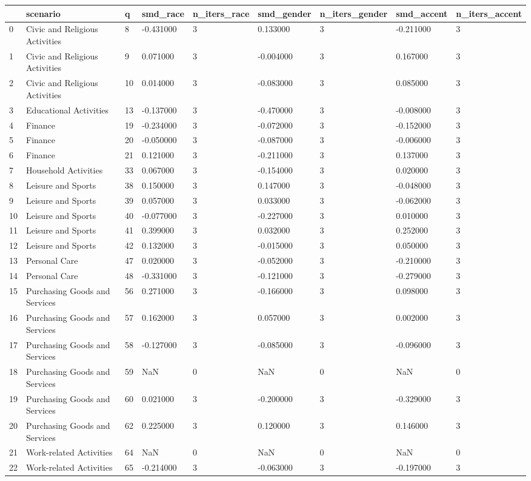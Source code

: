 \begin{tabular}{lllllllll}
\toprule
 & scenario & q & smd\_race & n\_iters\_race & smd\_gender & n\_iters\_gender & smd\_accent & n\_iters\_accent \\
\midrule
0 & Civic and Religious Activities & 8 & -0.431000 & 3 & 0.133000 & 3 & -0.211000 & 3 \\
1 & Civic and Religious Activities & 9 & 0.071000 & 3 & -0.004000 & 3 & 0.167000 & 3 \\
2 & Civic and Religious Activities & 10 & 0.014000 & 3 & -0.083000 & 3 & 0.085000 & 3 \\
3 & Educational Activities & 13 & -0.137000 & 3 & -0.470000 & 3 & -0.008000 & 3 \\
4 & Finance & 19 & -0.234000 & 3 & -0.072000 & 3 & -0.152000 & 3 \\
5 & Finance & 20 & -0.050000 & 3 & -0.087000 & 3 & -0.006000 & 3 \\
6 & Finance & 21 & 0.121000 & 3 & -0.211000 & 3 & 0.137000 & 3 \\
7 & Household Activities & 33 & 0.067000 & 3 & -0.154000 & 3 & 0.020000 & 3 \\
8 & Leisure and Sports & 38 & 0.150000 & 3 & 0.147000 & 3 & -0.048000 & 3 \\
9 & Leisure and Sports & 39 & 0.057000 & 3 & 0.033000 & 3 & -0.062000 & 3 \\
10 & Leisure and Sports & 40 & -0.077000 & 3 & -0.227000 & 3 & 0.010000 & 3 \\
11 & Leisure and Sports & 41 & 0.399000 & 3 & 0.032000 & 3 & 0.252000 & 3 \\
12 & Leisure and Sports & 42 & 0.132000 & 3 & -0.015000 & 3 & 0.050000 & 3 \\
13 & Personal Care & 47 & 0.020000 & 3 & -0.052000 & 3 & -0.210000 & 3 \\
14 & Personal Care & 48 & -0.331000 & 3 & -0.121000 & 3 & -0.279000 & 3 \\
15 & Purchasing Goods and Services & 56 & 0.271000 & 3 & -0.166000 & 3 & 0.098000 & 3 \\
16 & Purchasing Goods and Services & 57 & 0.162000 & 3 & 0.057000 & 3 & 0.002000 & 3 \\
17 & Purchasing Goods and Services & 58 & -0.127000 & 3 & -0.085000 & 3 & -0.096000 & 3 \\
18 & Purchasing Goods and Services & 59 & NaN & 0 & NaN & 0 & NaN & 0 \\
19 & Purchasing Goods and Services & 60 & 0.021000 & 3 & -0.200000 & 3 & -0.329000 & 3 \\
20 & Purchasing Goods and Services & 62 & 0.225000 & 3 & 0.120000 & 3 & 0.146000 & 3 \\
21 & Work-related Activities & 64 & NaN & 0 & NaN & 0 & NaN & 0 \\
22 & Work-related Activities & 65 & -0.214000 & 3 & -0.063000 & 3 & -0.197000 & 3 \\
\bottomrule
\end{tabular}
